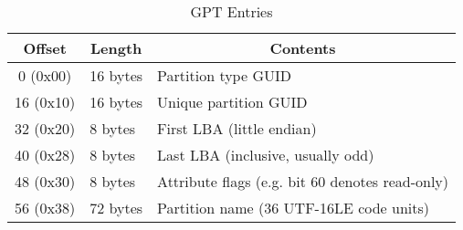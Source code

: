 
\begin{table}[h]
\begin{center}
	\begin{tabular}{|c|l|l|}\hline
		\multicolumn{1}{c}{ \bfseries Offset} & \multicolumn{1}{c}{\bfseries Length} & \multicolumn{1}{c}{\bfseries Contents} \\ \hline 
		0 (0x00) & 16 bytes & Partition type GUID \\ \hline
		16 (0x10)&	16 bytes&	Unique partition GUID\\ \hline
		32 (0x20)&	8 bytes&	First LBA (little endian)\\ \hline
		40 (0x28)&	8 bytes&	Last LBA (inclusive, usually odd)\\ \hline
		48 (0x30)&	8 bytes&	Attribute flags (e.g. bit 60 denotes read-only)\\ \hline
		56 (0x38)&	72 bytes&	Partition name (36 UTF-16LE code units)\\ \hline
	\end{tabular}
\end{center}
	\caption{GPT Entries}
\end{table}

